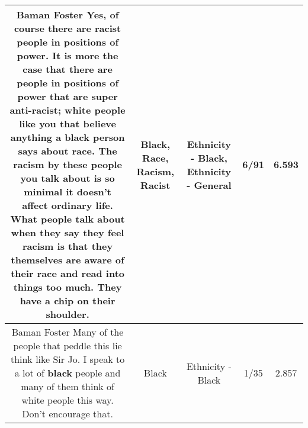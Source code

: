 \documentclass[11pt]{article}
\newlength\mylength
\begin{document}
\begin{center}
\begin{longtable}{|C{.65\mylength}|C{.30\mylength}|C{.12\mylength}|C{.12\mylength}|C{.12\mylength}|}
  \small Baman Foster Yes, of course there are \textbf{racist} people in positions of power. It is more the case that there are people in positions of power that are super anti-\textbf{racist}; white people like you that believe anything a \textbf{black} person says about \textbf{race}. The \textbf{racism} by these people you talk about is so minimal it doesn't affect ordinary life. What people talk about when they say they feel \textbf{racism} is that they themselves are aware of their \textbf{race} and read into things too much. They have a chip on their shoulder.\normalsize   & Black, Race, Racism, Racist & Ethnicity - Black, Ethnicity - General & 6/91 & 6.593 \\  \hline
  \small Baman Foster Many of the people that peddle this lie think like Sir Jo. I speak to a lot of \textbf{black} people and many of them think of white people this way. Don't encourage that.\normalsize   & Black & Ethnicity - Black & 1/35 & 2.857 \\  \hline

\end{longtable}
\end{center}
\end{document}
